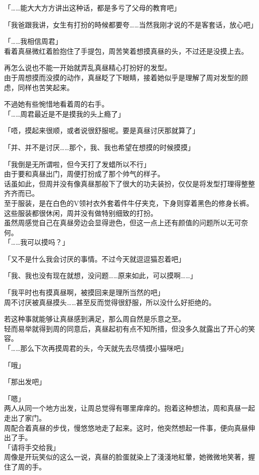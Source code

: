 「……能大大方方讲出这种话，都是多亏了父母的教育吧」

「我爸跟我讲，女生有打扮的時候都要夸……当然我刚才说的不是客套话，放心吧」

「……我相信周君」\\

看着真昼微红着脸抱住了手提包，周苦笑着想摸真昼的头，不过还是没摸上去。

再怎么说也不能一开始就弄乱真昼精心打扮好的发型。\\

由于周想摸而没摸的动作，真昼眨了下眼睛，接着她似乎是理解了周对发型的顾虑，同样也苦笑起来。

不過她有些惋惜地看着周的右手。\\

「……周君最近是不是摸我的头上瘾了」

「唔，摸起来很顺，或者说很舒服呢。要是真昼讨厌那就算了」

「并、并不是讨厌……那个，我、我也希望在想摸的时候摸摸」

「我倒是无所谓啦，但今天打了发蜡所以不行」\\

由于要和真昼出门，周便打扮成了那个帅气的样子。\\

话虽如此，但周并没有像真昼那般下了很大的功夫装扮，仅仅是将发型打理得整整齐齐而已。\\

至于服装，是在白色的V领衬衣外套着件牛仔夹克，下身则穿着黑色的修身长裤。这些服装都很休闲，周并没有做特别细致的打扮。\\

虽然周感觉自己在真昼旁边会显得逊色，但这一点上还有颜值的问题所以无可奈何。\\

「……我可以摸吗？」

「又不是什么我会讨厌的事情。不过今天就逗逗猫忍着吧」

「我、我也没有现在就想，没问题……原来如此，可以摸啊……」

「我平时也有摸真昼啊，被摸回来是理所当然的吧」\\

周不讨厌被真昼摸头……甚至反而觉得很舒服，所以没什么好拒绝的。%

若这种事就能够让真昼感到满足，那么周自然是乐意之至。\\

轻而易举就得到周的同意后，真昼起初有点不知所措，但没多久就露出了开心的笑容。\\

「……那么下次再摸周君的头，今天就先去尽情摸小猫咪吧」

「哦」

「那出发吧」

「嗯」\\

两人从同一个地方出发，让周总觉得有哪里痒痒的。抱着这种想法，周和真昼一起走出了家门。\\

周配合着真昼的步伐，慢悠悠地走了起来。这时，他突然想起一件事，便向真昼伸出了手。\\

「请将手交给我」\\

周像是开玩笑似的这么一说，真昼的脸蛋就染上了淺淺地紅暈，她微微地笑著，握住了周的手。
